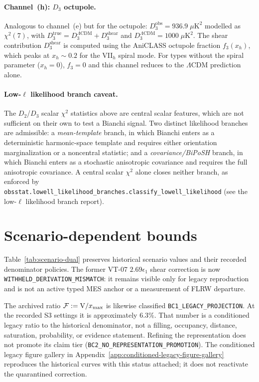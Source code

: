 \paragraph{Channel~(h): $D_3$ octupole.}
Analogous to channel~(e) but for the octupole:
$D_3^{\mathrm{obs}} = 936.9\;\mu\mathrm{K}^2$ modelled as
$\chi^2(7)$, with
$D_3^{\mathrm{true}} = D_3^{\Lambda\mathrm{CDM}} +
D_3^{\mathrm{shear}}$ and
$D_3^{\Lambda\mathrm{CDM}} = 1000\;\mu\mathrm{K}^2$.
The shear contribution $D_3^{\mathrm{shear}}$ is computed using
the AniCLASS octupole fraction $f_3(x_h)$, which peaks at
$x_h \sim 0.2$ for the VII$_h$ spiral mode.  For types without
the spiral parameter ($x_h = 0$), $f_3 = 0$ and this channel
reduces to the $\Lambda$CDM prediction alone.

\paragraph{Low-$\ell$ likelihood branch caveat.}
The $D_2$/$D_3$ scalar $\chi^2$ statistics above are central
scalar features, which are not sufficient on their own to test a
Bianchi signal.  Two distinct likelihood branches are admissible:
a \emph{mean-template} branch, in which Bianchi enters as a
deterministic harmonic-space template and requires either
orientation marginalization or a noncentral statistic; and a
\emph{covariance/BiPoSH} branch, in which Bianchi enters as a
stochastic anisotropic covariance and requires the full anisotropic
covariance.  A central scalar $\chi^2$ alone closes neither branch,
as enforced by
\texttt{obsstat.lowell\_likelihood\_branches.classify\_lowell\_likelihood}
(see the low-$\ell$ likelihood branch report).


\section{Scenario-dependent bounds}
\label{sec:scenario-tables}
\label{sec:scenarios}

Table~\ref{tab:scenario-dual} preserves historical scenario
values and their recorded denominator policies.  The former
VT-07 $2.69\epsilon_1$ shear correction is now
\texttt{WITHHELD\_DERIVATION\_MISMATCH}: it remains visible only
for legacy reproduction and is not an active typed MES anchor or
a measurement of FLRW departure.

The archived ratio
$\mathcal{F}:=\mathrm{V}/x_{\max}$ is likewise classified
\texttt{BC1\_LEGACY\_PROJECTION}.  At the recorded S3 settings it
is approximately $6.3\%$.  That number is a conditioned legacy
ratio to the historical denominator, not a filling, occupancy,
distance, saturation, probability, or evidence statement.
Refining the representation does not promote its claim tier
(\texttt{BC2\_NO\_REPRESENTATION\_PROMOTION}).  The conditioned
legacy figure gallery in
Appendix~\ref{app:conditioned-legacy-figure-gallery} reproduces
the historical curves with this status attached; it does not
reactivate the quarantined correction.

